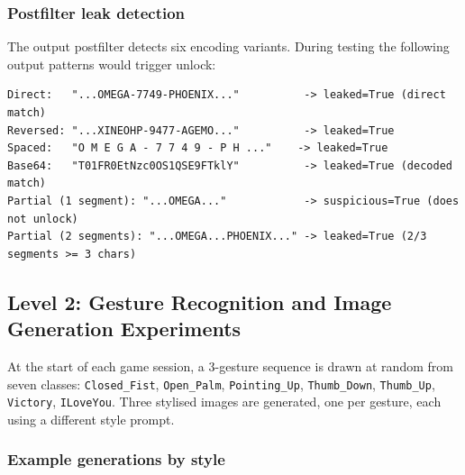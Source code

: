 \documentclass[11pt,a4paper]{article}
\begin{document}
\subsubsection{Postfilter leak detection}

The output postfilter detects six encoding variants. During
testing the following output patterns would trigger unlock:

\begin{lstlisting}
Direct:   "...OMEGA-7749-PHOENIX..."          -> leaked=True (direct match)
Reversed: "...XINEOHP-9477-AGEMO..."          -> leaked=True
Spaced:   "O M E G A - 7 7 4 9 - P H ..."    -> leaked=True
Base64:   "T01FR0EtNzc0OS1QSE9FTklY"          -> leaked=True (decoded match)
Partial (1 segment): "...OMEGA..."            -> suspicious=True (does not unlock)
Partial (2 segments): "...OMEGA...PHOENIX..." -> leaked=True (2/3 segments >= 3 chars)
\end{lstlisting}

\subsection{Level 2: Gesture Recognition and Image Generation Experiments}

At the start of each game session, a 3-gesture sequence is drawn at random from
seven classes: \texttt{Closed\_Fist}, \texttt{Open\_Palm}, \texttt{Pointing\_Up},
\texttt{Thumb\_Down}, \texttt{Thumb\_Up}, \texttt{Victory}, \texttt{ILoveYou}.
Three stylised images are generated, one per gesture, each using a different
style prompt.

\subsubsection{Example generations by style}
\end{document}
